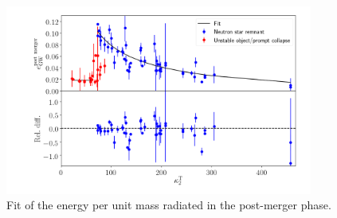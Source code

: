 \documentclass[aps,prl,onecolumn,superscriptaddress,groupedaddress,nofootinbib,floatfix,notitlepage]{revtex4-1}
\begin{document}
\begin{figure}[t]
  \centering 
  \includegraphics[width=0.9\textwidth]{egw_pm_fitpowerlaw.png}
  \caption{Fit of the energy per unit mass radiated in the post-merger phase.}
  \label{fig:etot_fit}
\end{figure}

%
\end{document}
